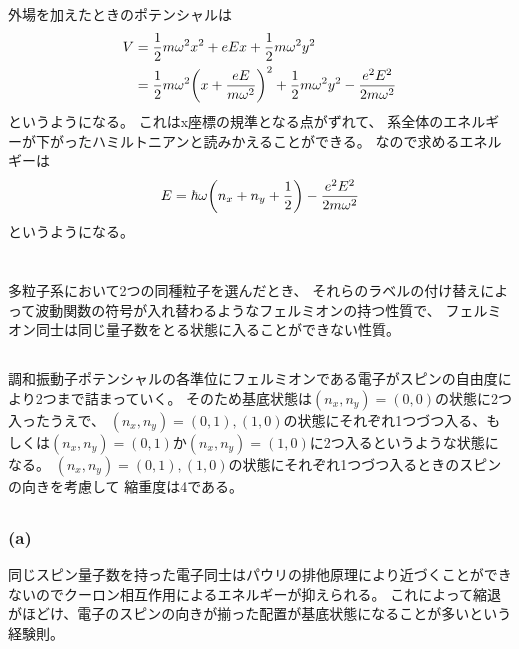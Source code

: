 \documentclass[../../master.tex]{subfiles}
\begin{document}
\section{}
外場を加えたときのポテンシャルは
\begin{align}
    V &= \frac{1}{2}m\omega^2 x^2 + eEx + \frac{1}{2}m\omega^2 y^2\\
    &= \frac{1}{2}m\omega^2 \qty(x+\frac{eE}{m\omega^2})^2 + \frac{1}{2}m\omega^2 y^2 - \frac{e^2E^2}{2m\omega^2}
\end{align}
というようになる。
これはx座標の規準となる点がずれて、
系全体のエネルギーが下がったハミルトニアンと読みかえることができる。
なので求めるエネルギーは
\begin{align}
    E = \hbar\omega\qty(n_x+n_y+\frac{1}{2})- \frac{e^2E^2}{2m\omega^2}
\end{align}
というようになる。

\section{}
\subsection{}
多粒子系において2つの同種粒子を選んだとき、
それらのラベルの付け替えによって波動関数の符号が入れ替わるようなフェルミオンの持つ性質で、
フェルミオン同士は同じ量子数をとる状態に入ることができない性質。

\subsection{}
調和振動子ポテンシャルの各準位にフェルミオンである電子がスピンの自由度により2つまで詰まっていく。
そのため基底状態は\((n_x,n_y)=(0,0)\)の状態に2つ入ったうえで、
\((n_x,n_y)=(0,1),(1,0)\)の状態にそれぞれ1つづつ入る、もしくは\((n_x,n_y)=(0,1)\)か\((n_x,n_y)=(1,0)\)に2つ入るというような状態になる。
\((n_x,n_y)=(0,1),(1,0)\)の状態にそれぞれ1つづつ入るときのスピンの向きを考慮して
縮重度は4である。
\subsection{}
\subsubsection{(a)}
同じスピン量子数を持った電子同士はパウリの排他原理により近づくことができないのでクーロン相互作用によるエネルギーが抑えられる。
これによって縮退がほどけ、電子のスピンの向きが揃った配置が基底状態になることが多いという経験則。
\end{document}
